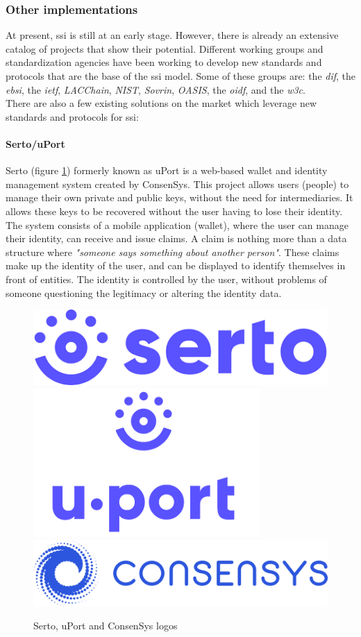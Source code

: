 \documentclass[a4paper, 12pt]{article} %
\begin{document}
            \subsubsection{Other implementations}
                At present, \acrlong{ssi} is still at an early stage. However, there is already an extensive catalog of projects that show their potential. Different working groups and standardization agencies have been working to develop new standards and protocols that are the base of the \acrshort{ssi} model\cite{ssi-wallets}. Some of these groups are: the \textit{\acrfull{dif}}, the \textit{\acrfull{ebsi}}, the \textit{\acrfull{ietf}}, \textit{LACChain}, \textit{NIST}, \textit{Sovrin}, \textit{OASIS}, the \textit{\acrfull{oidf}}, and the \textit{\acrfull{w3c}}.\\
                
                There are also a few existing solutions on the market which leverage new standards and protocols for \acrshort{ssi}:
                \paragraph{Serto/uPort}
                    Serto\cite{serto} (figure \ref{fig:uport}) formerly known as uPort\cite{uport} is a web-based wallet and identity management system created by ConsenSys\cite{consenSys}. This project allows users (people) to manage their own private and public keys, without the need for intermediaries. It allows these keys to be recovered without the user having to lose their identity. The system consists of a mobile application (wallet), where the user can manage their identity, can receive and issue claims. A claim is nothing more than a data structure where \textit{"someone says something about another person"}. These claims make up the identity of the user, and can be displayed to identify themselves in front of entities. The identity is controlled by the user, without problems of someone questioning the legitimacy or altering the identity data.
                    \begin{figure}[h]
                        \centering
                        \includegraphics[width=.2\textwidth]{serto-logo.png}\hfill
                        \includegraphics[width=.2\textwidth]{uport-logo.png}\hfill
                        \includegraphics[width=.3\textwidth]{consensys-horizontal-logo.png}
                        \caption{Serto, uPort and ConsenSys logos}
                        \label{fig:uport}
                    \end{figure}
                    
\end{document}
